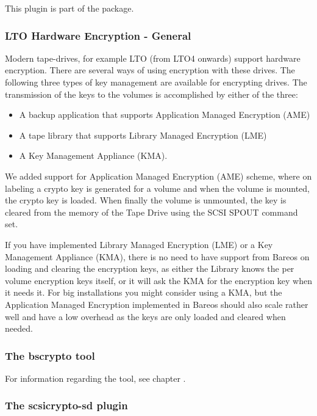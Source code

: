 This plugin is part of the  package.

\subsubsection{LTO Hardware Encryption - General}
\label{LTOHardwareEncryptionGeneral}

Modern tape-drives, for example LTO (from LTO4 onwards) support hardware encryption.
There are several ways of using encryption with these drives. The following three types of key management are available for encrypting drives. The transmission of the keys to the volumes is accomplished by either of the three:

\begin{itemize}
 \item A backup application that supports Application Managed Encryption (AME)
 \item A tape library that supports Library Managed Encryption (LME)
 \item A Key Management Appliance (KMA).
\end{itemize}

We added support for Application Managed Encryption (AME) scheme, where on labeling a crypto key is generated for a volume and when the volume is mounted, the crypto key is loaded. When finally the volume is unmounted, the key is cleared from the memory of the Tape Drive using the SCSI SPOUT command set.

If you have implemented Library Managed Encryption (LME) or a Key Management Appliance (KMA), there is no need to have support from Bareos on loading and clearing the encryption keys, as either the Library knows the per volume encryption keys itself, or it will ask the KMA for the encryption key when it needs it. For big installations you might consider using a KMA, but the Application Managed Encryption implemented in Bareos should also scale rather well and have a low overhead as the keys are only loaded and cleared when needed.

\subsubsection{The bscrypto tool}

For information regarding the  tool, see chapter .

\subsubsection{The scsicrypto-sd plugin}

